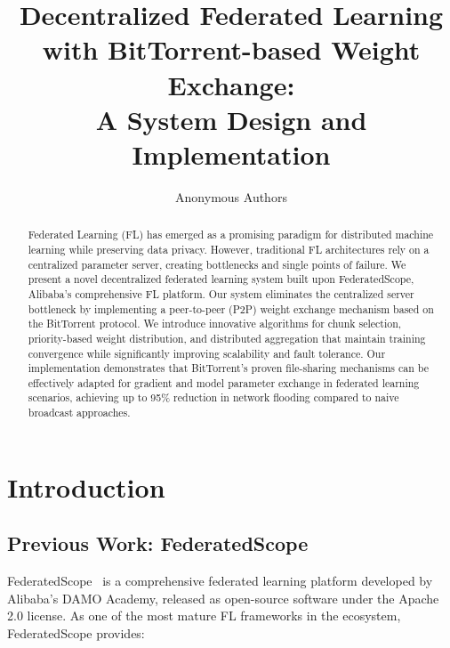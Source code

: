 \documentclass[11pt,conference]{article}
\title{Decentralized Federated Learning with BitTorrent-based Weight Exchange: \\ A System Design and Implementation}
\author{Anonymous Authors}
\date{}
\begin{document}
\maketitle

\begin{abstract}
Federated Learning (FL) has emerged as a promising paradigm for distributed machine learning while preserving data privacy. However, traditional FL architectures rely on a centralized parameter server, creating bottlenecks and single points of failure. We present a novel decentralized federated learning system built upon FederatedScope, Alibaba's comprehensive FL platform. Our system eliminates the centralized server bottleneck by implementing a peer-to-peer (P2P) weight exchange mechanism based on the BitTorrent protocol. We introduce innovative algorithms for chunk selection, priority-based weight distribution, and distributed aggregation that maintain training convergence while significantly improving scalability and fault tolerance. Our implementation demonstrates that BitTorrent's proven file-sharing mechanisms can be effectively adapted for gradient and model parameter exchange in federated learning scenarios, achieving up to 95\% reduction in network flooding compared to naive broadcast approaches.
\end{abstract}

\section{Introduction}

\subsection{Previous Work: FederatedScope}

FederatedScope~\cite{federatedscope2022} is a comprehensive federated learning platform developed by Alibaba's DAMO Academy, released as open-source software under the Apache 2.0 license. As one of the most mature FL frameworks in the ecosystem, FederatedScope provides:
\end{document}
